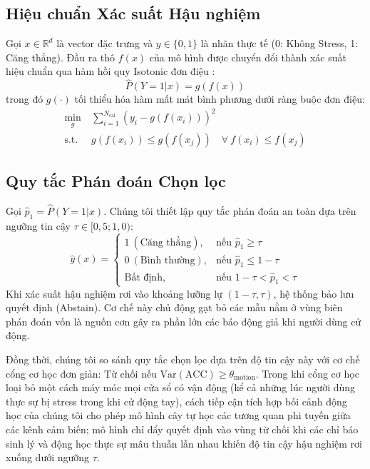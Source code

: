 \documentclass[conference]{IEEEtran}
\begin{document}
\subsection{Hiệu chuẩn Xác suất Hậu nghiệm}
Gọi $x \in \mathbb{R}^d$ là vector đặc trưng và $y \in \{0, 1\}$ là nhãn thực tế (0: Không Stress, 1: Căng thẳng). Đầu ra thô $f(x)$ của mô hình được chuyển đổi thành xác suất hiệu chuẩn qua hàm hồi quy Isotonic đơn điệu \cite{zadrozny2002transforming, niculescu2005predicting}:
\begin{equation}
\hat{P}(Y=1|x) = g(f(x))
\end{equation}
trong đó $g(\cdot)$ tối thiểu hóa hàm mất mát bình phương dưới ràng buộc đơn điệu:
\begin{equation}
\begin{aligned}
\min_{g} \ & \sum_{i=1}^{N_{\text{cal}}} \left( y_i - g(f(x_i)) \right)^2 \\
\text{s.t.} \ & g(f(x_i)) \le g(f(x_j)) \quad \forall \ f(x_i) \le f(x_j)
\end{aligned}
\end{equation}

\subsection{Quy tắc Phán đoán Chọn lọc}
Gọi $\hat{p}_1 = \hat{P}(Y=1|x)$. Chúng tôi thiết lập quy tắc phán đoán an toàn dựa trên ngưỡng tin cậy $\tau \in [0,5; 1,0)$:
\begin{equation}
\hat{y}(x) =
\begin{cases}
1 \ (\text{Căng thẳng}), & \text{nếu } \hat{p}_1 \ge \tau \\
0 \ (\text{Bình thường}), & \text{nếu } \hat{p}_1 \le 1 - \tau \\
\text{Bất định}, & \text{nếu } 1 - \tau < \hat{p}_1 < \tau
\end{cases}
\end{equation}
Khi xác suất hậu nghiệm rơi vào khoảng lưỡng lự $(1-\tau, \tau)$, hệ thống bảo lưu quyết định (Abstain). Cơ chế này chủ động gạt bỏ các mẫu nằm ở vùng biên phán đoán vốn là nguồn cơn gây ra phần lớn các báo động giả khi người dùng cử động.

Đồng thời, chúng tôi so sánh quy tắc chọn lọc dựa trên độ tin cậy này với cơ chế cổng cơ học đơn giản: $\text{Từ chối nếu } \text{Var}(\text{ACC}) \ge \theta_{\text{motion}}$. Trong khi cổng cơ học loại bỏ một cách máy móc mọi cửa sổ có vận động (kể cả những lúc người dùng thực sự bị stress trong khi cử động tay), cách tiếp cận tích hợp bối cảnh động học của chúng tôi cho phép mô hình cây tự học các tương quan phi tuyến giữa các kênh cảm biến; mô hình chỉ đẩy quyết định vào vùng từ chối khi các chỉ báo sinh lý và động học thực sự mâu thuẫn lẫn nhau khiến độ tin cậy hậu nghiệm rơi xuống dưới ngưỡng $\tau$.
\end{document}
